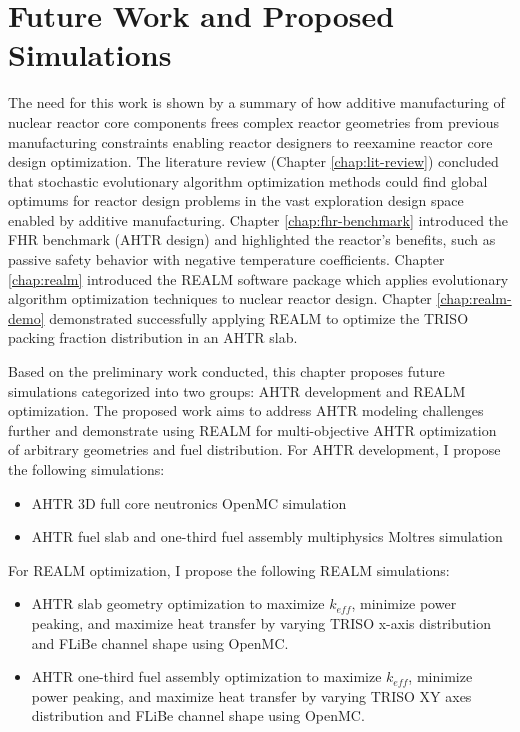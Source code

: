 \chapter{Future Work and Proposed Simulations}

The need for this work is shown by a summary of how additive manufacturing 
of nuclear reactor core components frees complex reactor geometries from 
previous manufacturing constraints enabling reactor designers to reexamine 
reactor core design optimization.
The literature review (Chapter \ref{chap:lit-review}) concluded that stochastic 
evolutionary algorithm optimization methods could find global 
optimums for reactor design problems in the vast exploration design space 
enabled by additive manufacturing. 
Chapter \ref{chap:fhr-benchmark} introduced the \acrfull{FHR} benchmark 
(\gls{AHTR} design) and highlighted the reactor's benefits, such as passive safety 
behavior with negative temperature coefficients. 
Chapter \ref{chap:realm} introduced the \acrfull{REALM} software package 
which applies evolutionary algorithm optimization techniques to nuclear 
reactor design. 
Chapter \ref{chap:realm-demo} demonstrated successfully applying \gls{REALM} 
to optimize the \gls{TRISO} packing fraction distribution in an \gls{AHTR} slab. 

Based on the preliminary work conducted, this chapter proposes 
future simulations categorized into two groups: \gls{AHTR} development and 
\gls{REALM} optimization. 
The proposed work aims to address \gls{AHTR} modeling challenges further and 
demonstrate using \gls{REALM} for multi-objective \gls{AHTR} 
optimization of arbitrary geometries and fuel distribution. 
For \gls{AHTR} development, I propose the following simulations: 
\begin{itemize}
    \item \gls{AHTR} 3D full core neutronics OpenMC simulation
    \item \gls{AHTR} fuel slab and one-third fuel assembly multiphysics 
    Moltres simulation
\end{itemize}
For \gls{REALM} optimization, I propose the following \gls{REALM} simulations: 
\begin{itemize}
    \item \gls{AHTR} slab geometry optimization to maximize $k_{eff}$, 
    minimize power peaking, and maximize heat transfer by varying \gls{TRISO} 
    x-axis distribution and \gls{FLiBe} channel shape using OpenMC. 
    \item \gls{AHTR} one-third fuel assembly optimization to maximize $k_{eff}$, 
    minimize power peaking, and maximize heat transfer by varying \gls{TRISO} 
    XY axes distribution and \gls{FLiBe} channel shape using OpenMC.
\end{itemize}

